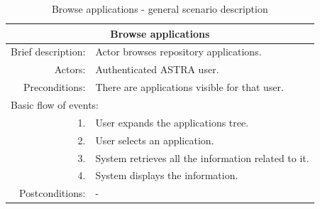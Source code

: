 \begin{table}[h!]
	\small
    \begin{center}
		\begin{tabular}{||r|l||}
		\hline \hline
		\multicolumn{2}{||c||}{\bfseries{Browse applications}} \\
		\hline
		\hline 
		Brief description: & Actor browses repository applications. \\
		\hline
		Actors: & Authenticated ASTRA user. \\
		\hline
		Preconditions: &  There are applications visible for that user. \\
		\hline \hline
		\multicolumn{2}{||l||}{Basic flow of events:} \\
		\hline \hline
			1. & User expands the applications tree. \\
			2. & User selects an application. \\
			3. & System retrieves all the information related to it.	\\ 
			4. & System displays the information. \\ \hline \hline
		Postconditions: &  - \\
		\hline \hline
		\end{tabular}
		\caption{\label{table:browse-app} Browse applications - general scenario
		description}
	\end{center}
\end{table}

